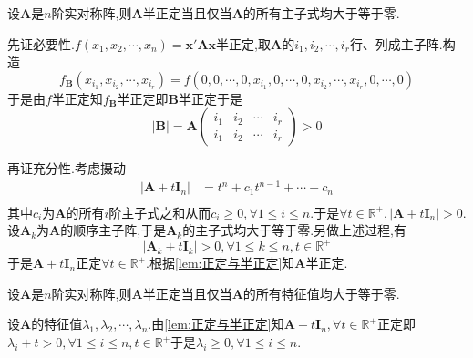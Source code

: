 \begin{green}
    \begin{lemma}[半正定的判定]\label{lem:半正定的判定2}
        设$\bm{A}$是$n$阶实对称阵,则$\bm{A}$半正定当且仅当$\bm{A}$的所有主子式均大于等于零.
    \end{lemma}
    \begin{Proof}
        先证必要性.$f\left(x_1,x_2,\cdots,x_n\right)=\bm{x}'\bm{Ax}$半正定,取$\bm{A}$的$i_1,i_2,\cdots,i_r$行、列成主子阵.构造\[
        f_{\bm{B}}\left(
            x_{i_1},x_{i_2},\cdots,x_{i_r}
        \right)=f\left(
            0,0,\cdots,0,x_{i_1},0,\cdots,0,x_{i_2},\cdots,x_{i_r},0,\cdots,0
        \right)
        \]于是由$f$半正定知$f_{\bm{B}}$半正定即$\bm{B}$半正定于是\[
        \left|\bm{B}\right|=\bm{A}\begin{pmatrix}
            i_1&i_2&\cdots&i_r\\
            i_1&i_2&\cdots&i_r
        \end{pmatrix}>0
        \]

        再证充分性.考虑摄动\begin{align*}
            \left|\bm{A}+t\bm{I}_n\right|&=t^n+c_1t^{n-1}+\cdots+c_n\\
        \end{align*}其中$c_i$为$\bm{A}$的所有$i$阶主子式之和从而$c_i\geqslant 0,\forall 1\leqslant i\leqslant n.$于是$\forall t\in\mathbb{R}^+,\left|\bm{A}+t\bm{I}_n\right|>0.$设$\bm{A}_k$为$\bm{A}$的顺序主子阵,于是$\bm{A}_k$的主子式均大于等于零.另做上述过程,有\[
        \left|
        \bm{A}_k+t\bm{I}_k
        \right|>0,\forall 1\leqslant k\leqslant n,t\in\mathbb{R}^+
        \]于是$\bm{A}+t\bm{I}_n$正定$\forall t\in\mathbb{R}^+$.根据\cref{lem:正定与半正定}知$\bm{A}$半正定.
    \end{Proof}
\end{green}
\begin{green}
    \begin{lemma}
        设$\bm{A}$是$n$阶实对称阵,则$\bm{A}$半正定当且仅当$\bm{A}$的所有特征值均大于等于零.
    \end{lemma}
    \begin{Proof}
        设$\bm{A}$的特征值$\lambda_1,\lambda_2,\cdots,\lambda_n.$由\cref{lem:正定与半正定}知$\bm{A}+t\bm{I}_n,\forall t\in\mathbb{R}^+$正定即$\lambda_i+t>0,\forall 1\leqslant i\leqslant n,t\in\mathbb{R}^+$于是$\lambda_i\geqslant 0,\forall 1\leqslant i\leqslant n.$
    \end{Proof}
\end{green}
